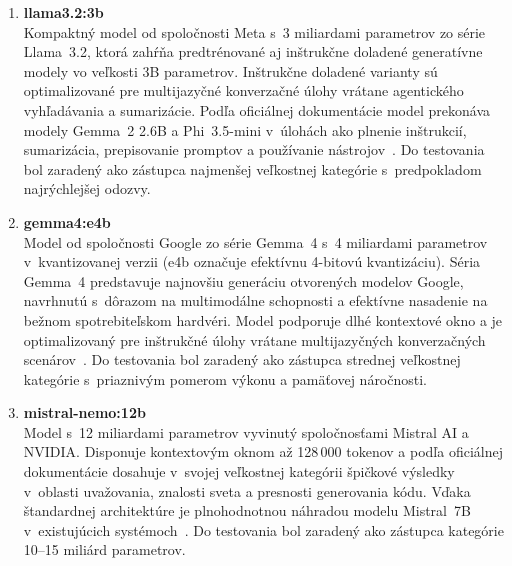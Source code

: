 \begin{enumerate}

      \item \textbf{llama3.2:3b} \\
            Kompaktný model od spoločnosti Meta s~3 miliardami parametrov zo série Llama~3.2,
            ktorá zahŕňa predtrénované aj inštrukčne doladené generatívne modely vo veľkosti
            3B parametrov. Inštrukčne doladené varianty sú optimalizované pre multijazyčné
            konverzačné úlohy vrátane agentického vyhľadávania a sumarizácie.
            Podľa oficiálnej dokumentácie model prekonáva modely Gemma~2 2.6B
            a Phi~3.5-mini v~úlohách ako plnenie inštrukcií, sumarizácia,
            prepisovanie promptov a používanie nástrojov~\cite{t21}.
            Do testovania bol zaradený ako zástupca najmenšej veľkostnej kategórie
            s~predpokladom najrýchlejšej odozvy.

      \item \textbf{gemma4:e4b} \\
            Model od spoločnosti Google zo série Gemma~4 s~4 miliardami parametrov
            v~kvantizovanej verzii (e4b označuje efektívnu 4-bitovú kvantizáciu).
            Séria Gemma~4 predstavuje najnovšiu generáciu otvorených modelov Google,
            navrhnutú s~dôrazom na multimodálne schopnosti a efektívne nasadenie
            na bežnom spotrebiteľskom hardvéri. Model podporuje dlhé kontextové okno
            a je optimalizovaný pre inštrukčné úlohy vrátane multijazyčných
            konverzačných scenárov~\cite{t22}.
            Do testovania bol zaradený ako zástupca strednej veľkostnej kategórie
            s~priaznivým pomerom výkonu a pamäťovej náročnosti.

      \item \textbf{mistral-nemo:12b} \\
            Model s~12 miliardami parametrov vyvinutý spoločnosťami Mistral AI a NVIDIA.
            Disponuje kontextovým oknom až 128\,000 tokenov a podľa oficiálnej dokumentácie
            dosahuje v~svojej veľkostnej kategórii špičkové výsledky v~oblasti uvažovania,
            znalosti sveta a presnosti generovania kódu. Vďaka štandardnej architektúre je
            plnohodnotnou náhradou modelu Mistral~7B v~existujúcich systémoch~\cite{t23}.
            Do testovania bol zaradený ako zástupca kategórie 10--15 miliárd parametrov.


\end{enumerate}
